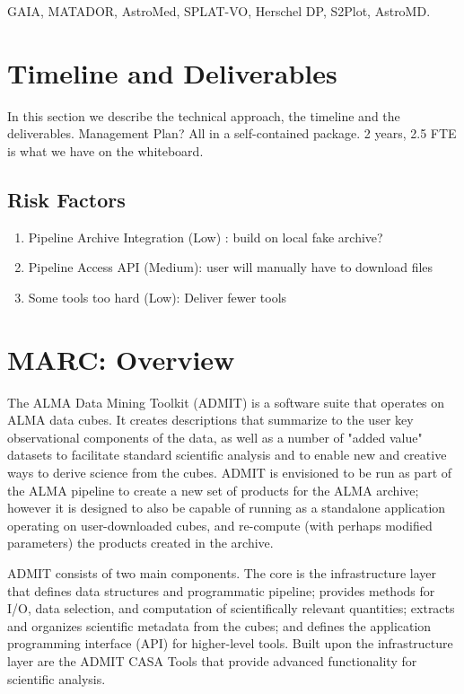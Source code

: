 \documentclass[preprint]{aastex} %
\begin{document}
GAIA, MATADOR, AstroMed, SPLAT-VO, Herschel DP, S2Plot, AstroMD. 


\section{Timeline and Deliverables}

In this section we describe the technical approach, the
timeline and the deliverables. Management Plan? 
All in a self-contained package.
2 years, 2.5 FTE is what we have on the whiteboard.

\subsection{Risk Factors}

\begin{enumerate}
\item
Pipeline Archive Integration (Low) : build on local fake archive?
\item
Pipeline Access API (Medium): user will manually have to download files
\item
Some tools too hard (Low): Deliver fewer tools

\end{enumerate}

\section { MARC: Overview }
The ALMA Data Mining Toolkit (ADMIT) is a software suite that operates on
ALMA data cubes. It creates descriptions that summarize to the user key
observational components of the data, as well as a number of "added value"
datasets to facilitate standard scientific analysis and to enable new and
creative ways to derive science from the cubes.  ADMIT is envisioned to
be run as part of the ALMA pipeline to create a new set of products for
the ALMA archive; however it is designed to also be capable of running
as a standalone application operating on user-downloaded cubes, and
re-compute (with perhaps modified parameters) the products created
in the archive.

ADMIT consists of two main components. The core is the infrastructure layer
that defines data structures and programmatic pipeline; provides methods
for I/O, data selection, and computation of scientifically relevant
quantities; extracts and organizes scientific metadata from the cubes; and
defines the application programming interface (API) for higher-level tools.
Built upon the infrastructure layer are the ADMIT CASA Tools that provide
advanced functionality for scientific analysis.
\end{document}
